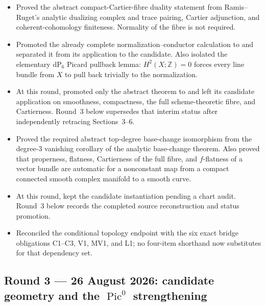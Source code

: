 \begin{itemize}[leftmargin=1.8em]
\item Proved the abstract compact-Cartier-fibre duality statement from
Ramis--Ruget's analytic dualizing complex and trace pairing, Cartier
adjunction, and coherent-cohomology finiteness.  Normality of the fibre is
not required.
\item Promoted the already complete normalization--conductor calculation to
\Verified{} and separated it from its \Conditional{} application to the
candidate.  Also isolated the elementary $\mathrm{dP}_6$ Picard pullback
lemma: $H^2(X;\mathbb Z)=0$ forces every line bundle from $X$ to pull back
trivially to the normalization.
\item At this round, promoted only the abstract theorem to \Verified{} and
left its candidate application \Conditional{} on smoothness, compactness,
the full scheme-theoretic fibre, and Cartierness.  Round~3 below supersedes
that interim status after independently retracing Sections~3--6.
\item Proved the required abstract top-degree base-change isomorphism from
the degree-$3$ vanishing corollary of the analytic base-change theorem.
Also proved that properness, flatness, Cartierness of the full fibre, and
$f$-flatness of a vector bundle are automatic for a nonconstant map from a
compact connected smooth complex manifold to a smooth curve.
\item At this round, kept the candidate instantiation \Open{} pending a chart
audit.  Round~3 below records the completed source reconstruction and status
promotion.
\item Reconciled the conditional topology endpoint with the six exact bridge
obligations C1--C3, V1, MV1, and L1; no four-item shorthand now substitutes
for that dependency set.
\end{itemize}

\subsection*{Round 3 --- 26 August 2026: candidate geometry and the
$\operatorname{Pic}^0$ strengthening}

